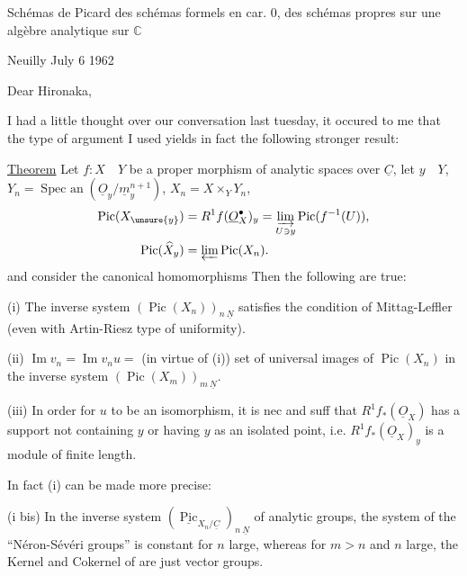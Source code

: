 
Schémas de Picard des schémas formels en car. 0,  des schémas propres sur une algèbre analytique sur $\mathbb{C}$



\begin{flushright}Neuilly July 6 1962\end{flushright}

Dear Hironaka,

I had a little thought over our conversation last tuesday, it occured to me that the type of argument I used yields in fact the following stronger result:

\uline{Theorem} Let $f:X\quad Y$ be a proper morphism of analytic spaces over $\underline{C}$, let $y\quad Y$, $Y_n=\operatorname{Spec\ an}(\underline{O}_y/\underline{m}_y^{n+1})$, $X_n=X\times_Y Y_n$,
\[
\begin{aligned}
\operatorname{Pic}(X_{\unsure{y}})&=R^1f(\underline{O}_X^{\bullet})_y=\underset{U\ni y}{\varinjlim}\operatorname{Pic}(f^{-1}(U)),\\
\operatorname{Pic}(\widehat{X}_y)&=\varprojlim\operatorname{Pic}(X_n).
\end{aligned}
\]
and consider the canonical homomorphisms
Then the following are true:

(i) The inverse system $(\operatorname{Pic}(X_n))_{n\ \underline{N}}$ satisfies the condition of Mittag-Leffler (even with Artin-Riesz type of uniformity).

(ii) $\operatorname{Im}v_n=\operatorname{Im}v_nu={}$ (in virtue of (i)) set of universal images of $\operatorname{Pic}(X_n)$ in the inverse system $(\operatorname{Pic}(X_m))_{m\ \underline{N}}$.

(iii) In order for $u$ to be an isomorphism, it is nec and suff that $R^1f_*(\underline{O}_X)$ has a support not containing $y$ or having $y$ as an isolated point, i.e. $R^1f_*(\underline{O}_X)_y$ is a module of finite length.

In fact (i) can be made more precise:

(i bis) In the inverse system $(\underline{\operatorname{Pic}}_{X_n/\underline{C}})_{n\ \underline{N}}$ of analytic groups, the system of the ``Néron-Sévéri groups'' is constant for $n$ large, whereas for $m>n$ and $n$ large, the Kernel and Cokernel of
are just vector groups.

